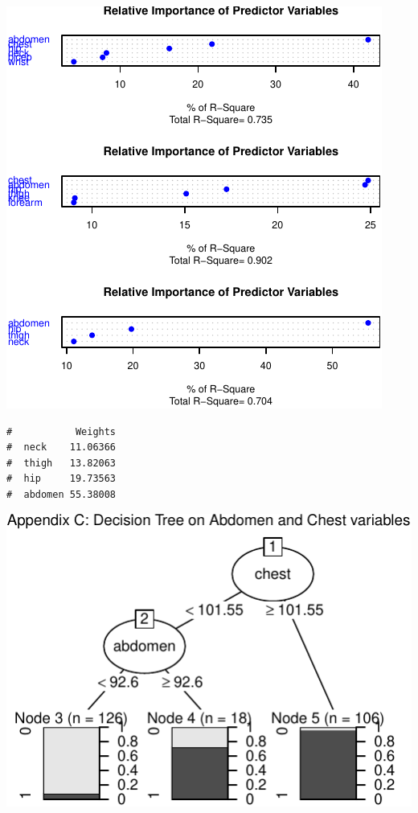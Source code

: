 \documentclass[a4paper,9pt,twocolumn,twoside,]{pinp}
\begin{document}
\begin{center}\includegraphics{Executive_Report_files/figure-latex/unnamed-chunk-5-1} \end{center}

\begin{ShadedResult}
\begin{verbatim}
#           Weights
#  neck    11.06366
#  thigh   13.82063
#  hip     19.73563
#  abdomen 55.38008
\end{verbatim}
\end{ShadedResult}

\begin{center}\includegraphics{Executive_Report_files/figure-latex/unnamed-chunk-6-1} \end{center}





\end{document}
